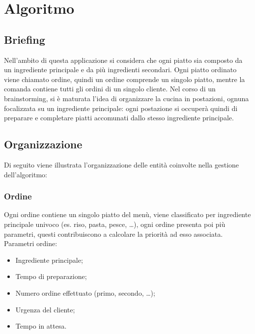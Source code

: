 \section{Algoritmo}
\subsection{Briefing}
Nell'ambito di questa applicazione si considera che ogni piatto sia composto da un ingrediente principale e da più ingredienti secondari. 
Ogni piatto ordinato viene chiamato ordine, quindi un ordine comprende un singolo piatto, mentre la comanda contiene tutti gli ordini di un singolo cliente.
Nel corso di un brainstorming, si è maturata l’idea di organizzare la cucina in postazioni, ognuna focalizzata su un ingrediente principale: ogni postazione si occuperà quindi di preparare e completare piatti accomunati dallo stesso ingrediente principale.
\subsection{Organizzazione} 
Di seguito viene illustrata l’organizzazione delle entità coinvolte nella gestione dell’algoritmo:
\subsubsection{Ordine}
Ogni ordine contiene un singolo piatto del menù, viene classificato per ingrediente principale univoco (es. riso, pasta, pesce, …), ogni ordine presenta poi più parametri, questi contribuiscono a calcolare la priorità ad esso associata.
Parametri ordine:
\begin{itemize}
	\item Ingrediente principale;
	\item Tempo di preparazione;
	\item Numero ordine effettuato (primo, secondo, …);
	\item Urgenza del cliente;
	\item Tempo in attesa.
\end{itemize}

